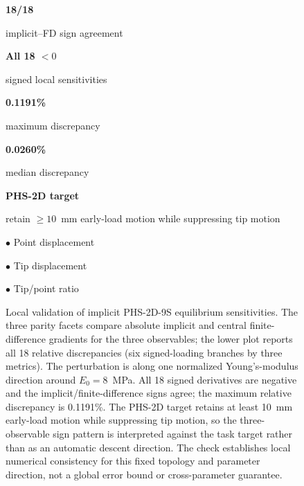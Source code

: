 \begin{figure}[t]
\begin{minipage}[t]{0.70\textwidth}
\end{minipage}\hfill
\begin{minipage}[t]{0.27\textwidth}
\small
\textbf{18/18}\par\scriptsize implicit--FD sign agreement
\vspace{3pt}

\textbf{All 18 $<0$}\par\scriptsize signed local sensitivities
\vspace{3pt}

\textbf{0.1191\%}\par\scriptsize maximum discrepancy
\vspace{3pt}

\textbf{0.0260\%}\par\scriptsize median discrepancy
\vspace{3pt}

\textbf{PHS-2D target}\par\scriptsize retain $\geq10$~mm early-load motion while suppressing tip motion

\textcolor{TraceNavy}{\scriptsize $\bullet$ Point displacement}\par
\textcolor{TraceTeal}{\scriptsize $\bullet$ Tip displacement}\par
\textcolor{TraceSlate}{\scriptsize $\bullet$ Tip/point ratio}
\end{minipage}
\caption{Local validation of implicit PHS-2D-9S equilibrium sensitivities. The three parity facets compare absolute implicit and central finite-difference gradients for the three observables; the lower plot reports all 18 relative discrepancies (six signed-loading branches by three metrics). The perturbation is along one normalized Young's-modulus direction around $E_0=8$~MPa. All 18 signed derivatives are negative and the implicit/finite-difference signs agree; the maximum relative discrepancy is 0.1191\%. The PHS-2D target retains at least 10~mm early-load motion while suppressing tip motion, so the three-observable sign pattern is interpreted against the task target rather than as an automatic descent direction. The check establishes local numerical consistency for this fixed topology and parameter direction, not a global error bound or cross-parameter guarantee.}
\label{fig:gradient-validation}
\end{figure}